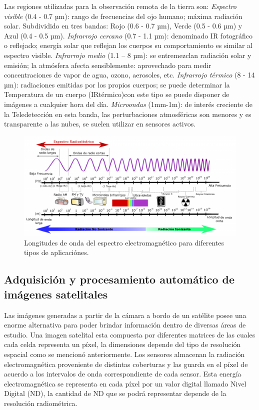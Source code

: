 Las regiones utilizadas para la observación remota de la tierra son: \textit{Espectro visible} (0.4 - 0.7 µm): rango de frecuencias del ojo humano; máxima radiación solar. Subdividido en tres bandas: Rojo (0.6 - 0.7 µm), Verde (0.5 - 0.6 µm) y Azul (0.4 - 0.5 µm). \textit{Infrarrojo cercano} (0.7 - 1.1 µm): denominado IR fotográfico o reflejado; energía solar que reflejan los cuerpos su comportamiento es similar al espectro visible. \textit{Infrarrojo medio} (1.1 – 8 µm): se entremezclan radiación solar y emisión; la atmósfera afecta sensiblemente: aprovechado para medir concentraciones de vapor de agua, ozono, aerosoles, etc. \textit{Infrarrojo térmico} (8 - 14 µm): radiaciones emitidas por los propios cuerpos; se puede determinar la Temperatura de un cuerpo (IRtérmico)con este tipo se puede disponer de imágenes a cualquier hora del día. \textit{Microondas} (1mm-1m): de interés creciente de la Teledetección en esta banda, las perturbaciones atmosféricas son menores y es transparente a las nubes, se suelen utilizar en sensores activos. 


\begin{figure}[H] \centering
  \includegraphics[scale=0.5,keepaspectratio=true,clip=true]{imagenes/MarcoTeorico/espectro-electro.png}
  \caption{Longitudes de onda del espectro electromagnético para diferentes tipos de aplicaciónes.}\label{Fig:espectro-electromagnetico}
\end{figure}



\subsection{Adquisición y procesamiento automático de imágenes satelitales}\label{sub:imagen_satelital}

Las imágenes generadas a partir de la cámara a bordo de un satélite posee una enorme alternativa para poder brindar información dentro de diversas áreas de estudio. Una imagen satelital esta compuesta por diferentes matrices de las cuales cada celda representa un píxel, la dimensiones  depende del tipo de resolución espacial como se mencionó anteriormente. Los sensores almacenan la radiación electromagnética proveniente de distintas coberturas y las guarda en el píxel de acuerdo a los intervalos de onda correspondiente de cada sensor. Esta energía electromagnética se representa en cada píxel por un valor digital llamado Nivel Digital (ND), la cantidad de ND que se podrá representar depende de la resolución radiométrica.

